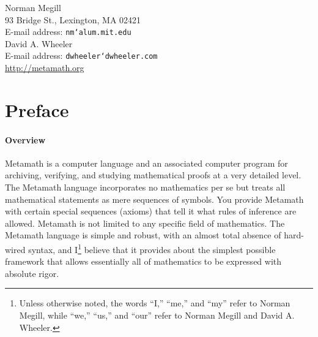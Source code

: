 \begin{center}
\hfill
\vfill

Norman Megill\\ 93 Bridge St., Lexington, MA 02421 \\
E-mail address: \texttt{nm{\char`\@}alum.mit.edu} \\
\vspace{7ex}
David A. Wheeler \\
E-mail address: \texttt{dwheeler{\char`\@}dwheeler.com} \\
\vspace{7ex}
\url{http://metamath.org}
\end{center}

%
%
%
%

\tableofcontents

\chapter*{Preface}



\subsubsection{Overview}

Metamath is a computer language and an associated computer
program for archiving, verifying, and studying mathematical proofs at a very
detailed level.  The Metamath language incorporates no mathematics per se but
treats all mathematical statements as mere sequences of symbols.  You provide
Metamath with certain special sequences (axioms) that tell it what rules
of inference are allowed.  Metamath is not limited to any specific field of
mathematics.  The Metamath language is simple and robust, with an
almost total absence of hard-wired syntax, and
I\footnote{Unless otherwise noted, the words
``I,'' ``me,'' and ``my'' refer to Norman Megill, while
``we,'' ``us,'' and ``our'' refer to Norman Megill and
David A. Wheeler.}
believe that it
provides about the simplest possible framework that allows essentially all of
mathematics to be expressed with absolute rigor.

